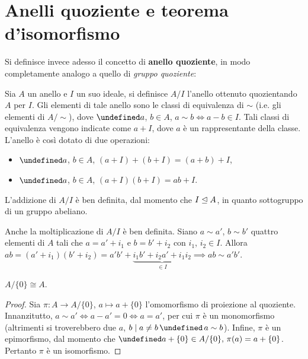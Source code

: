 \documentclass[a4paper]{article}
\let\oldforall\forall
\let\forall\undefined
\DeclareMathOperator{\forall}{\oldforall}
\let\oldland\land
\let\land\undefined
\DeclareMathOperator{\land}{\oldland}
\begin{document}
\section{Anelli quoziente e teorema d'isomorfismo}

Si definisce invece adesso il concetto di \textbf{anello quoziente}, in modo
completamente analogo a quello di \textit{gruppo quoziente}:

\begin{definition}
    Sia $A$ un anello e $I$ un suo ideale, si definisce $A/I$ l'anello ottenuto
    quozientando $A$ per $I$. Gli elementi di tale anello sono le classi di equivalenza di $\sim$ (i.e. gli elementi di $A/{\sim}$), dove $\forall a$, $b \in A$, $a\sim b \iff a-b \in I$. Tali classi di equivalenza vengono indicate come
    $a + I$, dove $a$ è un rappresentante della classe. L'anello è così dotato di due operazioni:

    \begin{itemize}
        \item $\forall a$, $b \in A$, $(a+I)+(b+I)=(a+b)+I$,
        \item $\forall a$, $b \in A$, $(a+I)(b+I)=ab+I$.
    \end{itemize}
\end{definition}

\begin{note}
    L'addizione di $A/I$ è ben definita, dal momento che $I \mathrel{\unlhd} A$, in quanto sottogruppo di un gruppo abeliano.
\end{note}

\begin{note}
    Anche la moltiplicazione di $A/I$ è ben definita. Siano $a\sim a'$, $b \sim b'$ quattro elementi di $A$ tali che $a = a' + i_1$ e $b = b' + i_2$ con $i_1$, $i_2 \in I$. Allora $ab=(a'+i_1)(b'+i_2)=a'b' + \underbrace{i_1b' + i_2a' + i_1i_2}_{\in I} \implies ab \sim a'b'$.
\end{note}

\begin{proposition}
    \label{prop:quoziente_pieno}
    $A/\{0\} \cong A$.
\end{proposition}

\begin{proof}
    Sia $\pi : A \to A/\{0\}$, $a \mapsto a + \{0\}$ l'omomorfismo di proiezione
    al quoziente. Innanzitutto, $a \sim a' \iff a-a'=0 \iff a=a'$, per cui $\pi$ è
    un monomorfismo (altrimenti si troverebbero due $a$, $b \mid a \neq b \,\land\, a \sim b$). Infine, $\pi$ è un epimorfismo, dal momento che $\forall a + \{0\} \in A/\{0\}, \, \pi(a) = a + \{0\}$. Pertanto $\pi$ è un isomorfismo.
\end{proof}
\end{document}

